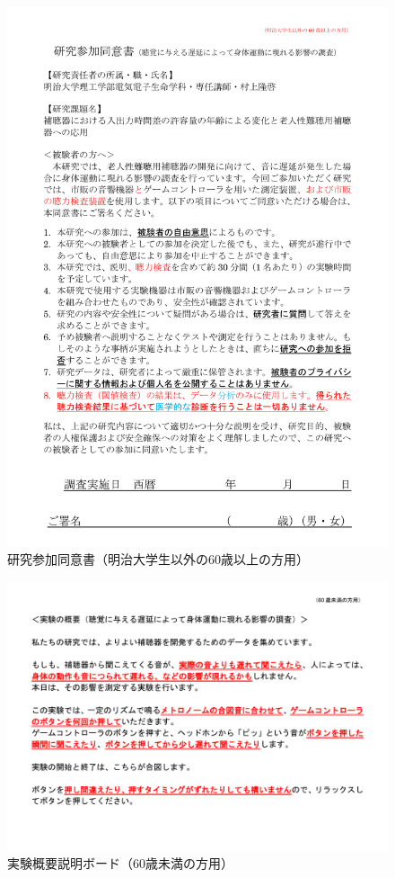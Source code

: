 \begin{figure}[ht]
  \centering
  \includegraphics[scale=0.6]{furoku_A/Douisyo_60NotMeiji.pdf}
  \caption{研究参加同意書（明治大学生以外の60歳以上の方用）}
\end{figure}
\begin{figure}[ht]
  \centering
  \includegraphics[scale=0.4]{furoku_A/Less60_gaiyou.pdf}
  \caption{実験概要説明ボード（60歳未満の方用）}
\end{figure}
